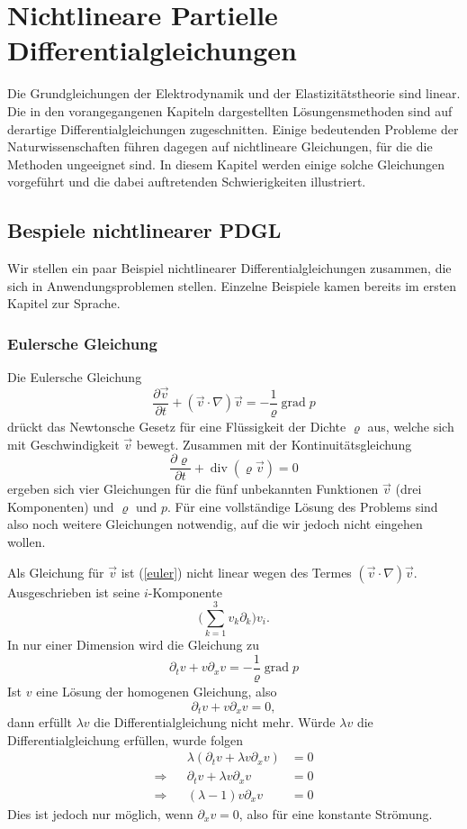%
%
%
\chapter{Nichtlineare Partielle Differentialgleichungen\label{chapter-nichtlinear}}
\rhead{}
Die Grundgleichungen der Elektrodynamik und der Elastizitätstheorie
sind linear. Die in den vorangegangenen Kapiteln dargestellten
Lösungensmethoden sind auf derartige Differentialgleichungen
zugeschnitten. Einige bedeutenden Probleme der Naturwissenschaften
führen dagegen auf nichtlineare Gleichungen, für die die
Methoden ungeeignet sind. In diesem Kapitel werden einige
solche Gleichungen vorgeführt und die dabei auftretenden
Schwierigkeiten illustriert.

\section{Bespiele nichtlinearer PDGL}
Wir stellen ein paar Beispiel nichtlinearer Differentialgleichungen
zusammen, die sich in Anwendungsproblemen stellen. Einzelne Beispiele
kamen bereits im ersten Kapitel zur Sprache.

\subsection{Eulersche Gleichung}
Die Eulersche Gleichung
\begin{equation}
\frac{\partial \vec v}{\partial t}+(\vec v\cdot\nabla)\vec v=-\frac1\varrho\operatorname{grad}p
\label{euler}
\end{equation}
drückt das Newtonsche Gesetz für eine Flüssigkeit der Dichte $\varrho$ aus,
welche sich mit Geschwindigkeit $\vec v$ bewegt.
Zusammen mit der Kontinuitätsgleichung
\[
\frac{\partial\varrho}{\partial t}+\operatorname{div}(\varrho \vec v)=0
\]
ergeben sich vier Gleichungen für die fünf unbekannten Funktionen
$\vec v$ (drei Komponenten) und $\varrho$ und $p$. Für eine vollständige
Lösung des Problems sind also noch weitere Gleichungen notwendig, auf die
wir jedoch nicht eingehen wollen.

Als Gleichung für $\vec v$ ist (\ref{euler}) nicht linear wegen des Termes
$(\vec v\cdot \nabla)\vec v$. Ausgeschrieben ist seine $i$-Komponente
\[
\biggl(\sum_{k=1}^3v_k\partial_k\biggr)v_i.
\]
In nur einer Dimension wird die Gleichung zu
\[
\partial_tv+v\partial_xv=-\frac1\varrho\operatorname{grad}p
\]
Ist $v$ eine Lösung der homogenen Gleichung, also
\[
\partial_t v+v\partial_x v=0,
\]
dann erfüllt $\lambda v$ die Differentialgleichung nicht mehr. Würde
$\lambda v$ die Differentialgleichung erfüllen, wurde folgen
\begin{align*}
&&\lambda(\partial_t v+\lambda v\partial_xv)&=0
\\
\Rightarrow
&&
\partial_t v+\lambda v\partial_xv&=0
\\
\Rightarrow
&&
(\lambda -1)v\partial_xv&=0
\end{align*}
Dies ist jedoch nur möglich, wenn $\partial_xv=0$, also für eine
konstante Strömung.

